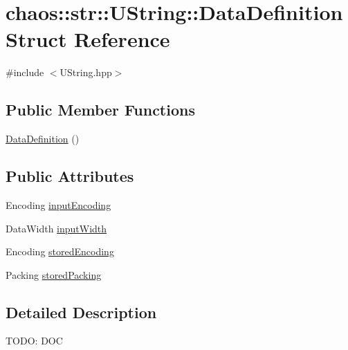 \hypertarget{structchaos_1_1str_1_1_u_string_1_1_data_definition}{\section{chaos\-:\-:str\-:\-:U\-String\-:\-:Data\-Definition Struct Reference}
\label{structchaos_1_1str_1_1_u_string_1_1_data_definition}
}


{\ttfamily \#include $<$U\-String.\-hpp$>$}

\subsection*{Public Member Functions}
\begin{DoxyCompactItemize}
\item 
\hyperlink{structchaos_1_1str_1_1_u_string_1_1_data_definition_ad5a209877809ea522a68f723efcd97ce}{Data\-Definition} ()
\end{DoxyCompactItemize}
\subsection*{Public Attributes}
\begin{DoxyCompactItemize}
\item 
Encoding \hyperlink{structchaos_1_1str_1_1_u_string_1_1_data_definition_a2f920e8c20c0c6e0a0a473e9772d99e1}{input\-Encoding}
\item 
Data\-Width \hyperlink{structchaos_1_1str_1_1_u_string_1_1_data_definition_ad8799df92d7d3ec4668675d918654df8}{input\-Width}
\item 
Encoding \hyperlink{structchaos_1_1str_1_1_u_string_1_1_data_definition_affc7bf4241c9d762501b8273e7c5536d}{stored\-Encoding}
\item 
Packing \hyperlink{structchaos_1_1str_1_1_u_string_1_1_data_definition_acdc0f7cef212180b4a3b6180bdd3b1bb}{stored\-Packing}
\end{DoxyCompactItemize}


\subsection{Detailed Description}
T\-O\-D\-O\-: D\-O\-C 

